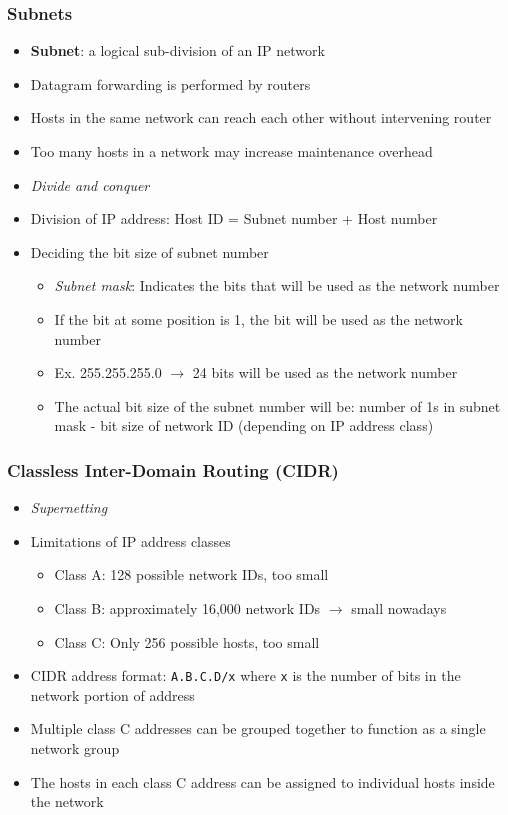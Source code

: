 \subsubsection{Subnets}
\begin{itemize}
	\item \textbf{Subnet}: a logical sub-division of an IP network
	\item Datagram forwarding is performed by routers
	\item Hosts in the same network can reach each other without intervening router
	\item Too many hosts in a network may increase maintenance overhead
	\item \textit{Divide and conquer}
	\item Division of IP address: Host ID = Subnet number + Host number
	\item Deciding the bit size of subnet number
	\begin{itemize}
		\item \textit{Subnet mask}: Indicates the bits that will be used as the network number
		\item If the bit at some position is 1, the bit will be used as the network number
		\item Ex. 255.255.255.0 \(\rightarrow\) 24 bits will be used as the network number
		\item The actual bit size of the subnet number will be: number of 1s in subnet mask - bit size of network ID (depending on IP address class)
	\end{itemize}
\end{itemize}

\subsubsection{Classless Inter-Domain Routing (CIDR)}
\begin{itemize}
	\item \textit{Supernetting}
	\item Limitations of IP address classes
	\begin{itemize}
		\item Class A: 128 possible network IDs, too small
		\item Class B: approximately 16,000 network IDs \(\rightarrow\) small nowadays
		\item Class C: Only 256 possible hosts, too small
	\end{itemize}
	\item CIDR address format: \texttt{A.B.C.D/x} where \texttt{x} is the number of bits in the network portion of address
	\item Multiple class C addresses can be grouped together to function as a single network group
	\item The hosts in each class C address can be assigned to individual hosts inside the network
\end{itemize}

